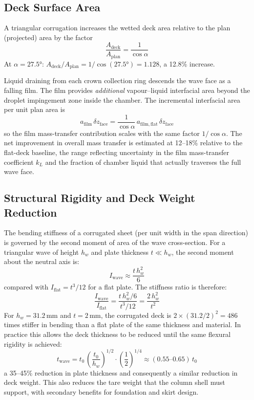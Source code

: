 \documentclass[11pt,letterpaper]{article}
\begin{document}
\subsection{Deck Surface Area}
\label{sec:wavy_area}

A triangular corrugation increases the wetted deck area relative to the
plan (projected) area by the factor
\begin{equation}
  \frac{A_{\mathrm{deck}}}{A_{\mathrm{plan}}} = \frac{1}{\cos\alpha}
  \label{eq:area_ratio}
\end{equation}
At $\alpha = 27.5°$: $A_{\mathrm{deck}}/A_{\mathrm{plan}} =
1/\cos(27.5°) = 1.128$, a 12.8\% increase.

Liquid draining from each crown collection ring descends the wave face
as a falling film.  The film provides \emph{additional} vapour--liquid
interfacial area beyond the droplet impingement zone inside the chamber.
The incremental interfacial area per unit plan area is
\[
  a_{\mathrm{film}}\,\delta z_{\mathrm{face}}
  = \frac{1}{\cos\alpha}\,a_{\mathrm{film,flat}}\,\delta z_{\mathrm{face}}
\]
so the film mass-transfer contribution scales with the same factor $1/\cos\alpha$.
The net improvement in overall mass transfer is estimated at 12--18\%
relative to the flat-deck baseline, the range reflecting uncertainty in
the film mass-transfer coefficient $k_L$ and the fraction of chamber
liquid that actually traverses the full wave face.

\subsection{Structural Rigidity and Deck Weight Reduction}
\label{sec:wavy_struct}

The bending stiffness of a corrugated sheet (per unit width in the
span direction) is governed by the second moment of area of the wave
cross-section.  For a triangular wave of height $h_w$ and plate
thickness $t \ll h_w$, the second moment about the neutral axis is:
\begin{equation}
  I_{\mathrm{wave}} \approx \frac{t\,h_w^2}{6}
  \label{eq:rigidity}
\end{equation}
compared with $I_{\mathrm{flat}} = t^3/12$ for a flat plate.  The
stiffness ratio is therefore:
\[
  \frac{I_{\mathrm{wave}}}{I_{\mathrm{flat}}}
  = \frac{t\,h_w^2/6}{t^3/12}
  = \frac{2\,h_w^2}{t^2}
\]
For $h_w = 31.2$\,mm and $t = 2$\,mm, the corrugated deck is
$2 \times (31.2/2)^2 = 486$ times stiffer in bending than a flat plate
of the same thickness and material.  In practice this allows the deck
thickness to be reduced until the same flexural rigidity is achieved:
\[
  t_{\mathrm{wave}} = t_0\,\left(\frac{t_0}{h_w}\right)^{1/2}\cdot
  \left(\frac{1}{2}\right)^{1/4}
  \approx (0.55\text{--}0.65)\,t_0
\]
a 35--45\% reduction in plate thickness and consequently a similar
reduction in deck weight.  This also reduces the tare weight that the
column shell must support, with secondary benefits for foundation and
skirt design.
\end{document}
